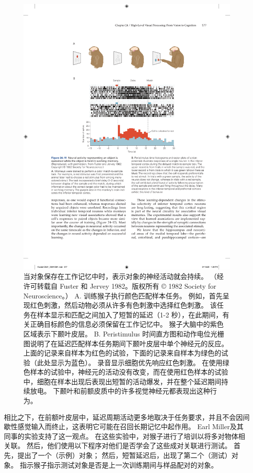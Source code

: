 \begin{figure}[htbp]
	\centering
	\includegraphics[width=0.75\linewidth]{chap24/fig_24_11}
	\caption{当对象保存在工作记忆中时，表示对象的神经活动就会持续。 （经许可转载自 Fuster 和 Jervey 1982。版权所有 © 1982 Society for Neuroscience。） A. 训练猴子执行颜色匹配样本任务。 例如，首先呈现红色刺激，然后动物必须从许多有色刺激中选择红色刺激。 该任务在样本显示和匹配之间加入了短暂的延迟（1-2 秒），在此期间，有关正确目标颜色的信息必须保留在工作记忆中。 猴子大脑中的紫色区域表示下颞叶皮层。 B. Peristimulus 时间直方图和动作电位光栅图说明了在延迟匹配样本任务期间下颞叶皮层中单个神经元的反应。 上面的记录来自样本为红色的试验，下面的记录来自样本为绿色的试验（此处显示为蓝色）。 录音显示细胞优先响应红色刺激。 在使用绿色样本的试验中，神经元的活动没有改变，而在使用红色样本的试验中，细胞在样本出现后表现出短暂的活动爆发，并在整个延迟期间持续放电。 下颞叶和前额皮质中的许多视觉神经元都表现出这种行为。}
	\label{fig:24_11}
\end{figure}


相比之下，在前额叶皮层中，延迟周期活动更多地取决于任务要求，并且不会因间歇性感觉输入而终止，这表明它可能在召回长期记忆中起作用。 
Earl Miller及其同事的实验支持了这一观点。
在这些实验中，对猴子进行了培训以将多对物体相关联。 
然后，他们使用以下程序对他们是否学会了这些成对关联进行测试。
首先，提出了一个（示例）对象； 然后，短暂延迟后，出现了第二个（测试）对象。
指示猴子指示测试对象是否是上一次训练期间与样品配对的对象。


